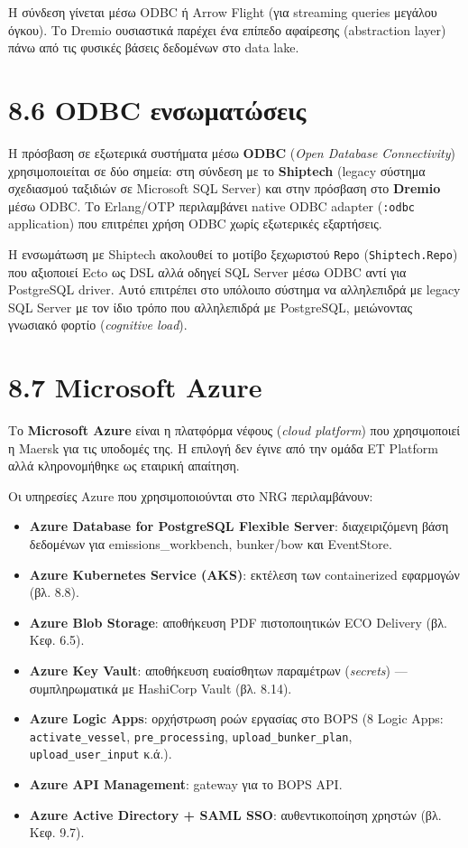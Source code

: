 Η σύνδεση γίνεται μέσω ODBC ή Arrow Flight (για streaming queries
μεγάλου όγκου). Το Dremio ουσιαστικά παρέχει ένα επίπεδο αφαίρεσης
(abstraction layer) πάνω από τις φυσικές βάσεις δεδομένων στο data lake.

\section{8.6 ODBC
ενσωματώσεις}\label{odbc-ux3b5ux3bdux3c3ux3c9ux3bcux3b1ux3c4ux3ceux3c3ux3b5ux3b9ux3c2}

Η πρόσβαση σε εξωτερικά συστήματα μέσω \textbf{ODBC} (\emph{Open
Database Connectivity}) χρησιμοποιείται σε δύο σημεία: στη σύνδεση με το
\textbf{Shiptech} (legacy σύστημα σχεδιασμού ταξιδιών σε Microsoft SQL
Server) και στην πρόσβαση στο \textbf{Dremio} μέσω ODBC. Το Erlang/OTP
περιλαμβάνει native ODBC adapter (\texttt{:odbc} application) που
επιτρέπει χρήση ODBC χωρίς εξωτερικές εξαρτήσεις.

Η ενσωμάτωση με Shiptech ακολουθεί το μοτίβο ξεχωριστού \texttt{Repo}
(\texttt{Shiptech.Repo}) που αξιοποιεί Ecto ως DSL αλλά οδηγεί SQL
Server μέσω ODBC αντί για PostgreSQL driver. Αυτό επιτρέπει στο υπόλοιπο
σύστημα να αλληλεπιδρά με legacy SQL Server με τον ίδιο τρόπο που
αλληλεπιδρά με PostgreSQL, μειώνοντας γνωσιακό φορτίο (\emph{cognitive
load}).

\section{8.7 Microsoft Azure}\label{microsoft-azure}

Το \textbf{Microsoft Azure} είναι η πλατφόρμα νέφους (\emph{cloud
platform}) που χρησιμοποιεί η Maersk για τις υποδομές της. Η επιλογή δεν
έγινε από την ομάδα ET Platform αλλά κληρονομήθηκε ως εταιρική απαίτηση.

Οι υπηρεσίες Azure που χρησιμοποιούνται στο NRG περιλαμβάνουν:

\begin{itemize}
\tightlist
\item
  \textbf{Azure Database for PostgreSQL Flexible Server}: διαχειριζόμενη
  βάση δεδομένων για emissions\_workbench, bunker/bow και EventStore.
\item
  \textbf{Azure Kubernetes Service (AKS)}: εκτέλεση των containerized
  εφαρμογών (βλ. 8.8).
\item
  \textbf{Azure Blob Storage}: αποθήκευση PDF πιστοποιητικών ECO
  Delivery (βλ. Κεφ. 6.5).
\item
  \textbf{Azure Key Vault}: αποθήκευση ευαίσθητων παραμέτρων
  (\emph{secrets}) --- συμπληρωματικά με HashiCorp Vault (βλ. 8.14).
\item
  \textbf{Azure Logic Apps}: ορχήστρωση ροών εργασίας στο BOPS (8 Logic
  Apps: \texttt{activate\_vessel}, \texttt{pre\_processing},
  \texttt{upload\_bunker\_plan}, \texttt{upload\_user\_input} κ.ά.).
\item
  \textbf{Azure API Management}: gateway για το BOPS API.
\item
  \textbf{Azure Active Directory + SAML SSO}: αυθεντικοποίηση χρηστών
  (βλ. Κεφ. 9.7).
\end{itemize}

